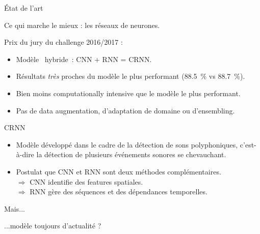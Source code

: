 \documentclass[compress,xcolor=table]{beamer}
\begin{document}
\begin{frame}{État de l'art}

    Ce qui marche le mieux : les réseaux de neurones.

    Prix du jury du challenge 2016/2017 :

    \begin{exampleblock}{ \cite{cakirConvolutionalRecurrentNeural2017a}}

        \begin{itemize}
            \item Modèle \og~hybride~\fg : CNN + RNN = CRNN.
            \item Résultats \textit{très} proches du modèle le plus performant (88.5~\% vs 88.7~\%).
            \item Bien moins computationally intensive que le modèle le plus performant.
            \item Pas de data augmentation, d'adaptation de domaine ou d'ensembling.
        \end{itemize}

    \end{exampleblock}

\end{frame}

\begin{frame}{CRNN}

    \begin{block}{\cite{cakirConvolutionalRecurrentNeural2017a}}

        \begin{itemize}
            \item Modèle développé dans le cadre de la détection de sons polyphoniques, c'est-à-dire la détection de plusieurs événements sonores se chevauchant.
            \item Postulat que CNN et RNN sont deux méthodes complémentaires.\\
                  $\Rightarrow$ CNN identifie des features spatiales.\\
                  $\Rightarrow$ RNN gère des séquences et des dépendances temporelles.
        \end{itemize}

    \end{block}

    \begin{alertblock}{Mais...}

        ...modèle toujours d'actualité ?

    \end{alertblock}

\end{frame}
\end{document}
